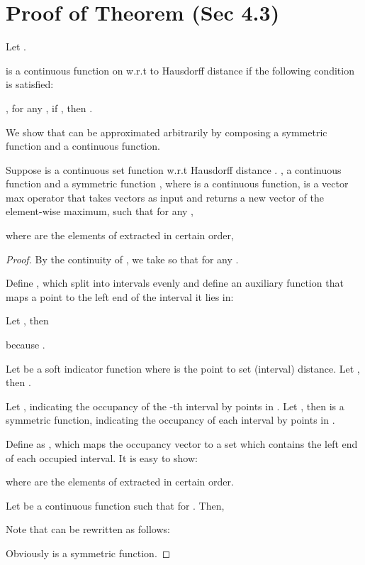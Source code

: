 \documentclass[10pt,twocolumn,letterpaper]{article}
\newenvironment{customthm}[1]
  {\renewcommand\theinnercustomthm{#1}\innercustomthm}
  {\endinnercustomthm}
\begin{document}
\section{Proof of Theorem (Sec 4.3)}
\label{sec:proof}
Let . 

 is a continuous function on  w.r.t to Hausdorff distance  if the following condition is satisfied:

, for any , if , then .

We show that  can be approximated arbitrarily by composing a symmetric function and a continuous function. 

\begin{customthm}{1}
Suppose  is a continuous set function w.r.t Hausdorff distance . ,  a continuous function  and a symmetric function , where  is a continuous function,  is a vector max operator that takes  vectors as input and returns a new vector of the element-wise maximum, such that for any ,

where  are the elements of  extracted in certain order, 
\end{customthm}


\begin{proof}
By the continuity of , we take  so that 
 for any . 

Define , which split  into  intervals evenly and define an auxiliary function that maps a point to the left end of the interval it lies in:

Let , then

because .

Let  be a soft indicator function where  is the point to set (interval) distance. Let , then . 

Let , indicating the occupancy of the -th interval by points in . Let , then  is a symmetric function, indicating the occupancy of each interval by points in . 

Define  as , which maps the occupancy vector to a set which contains the left end of each occupied interval. It is easy to show:

where  are the elements of  extracted in certain order.

Let  be a continuous function such that  for . Then,


Note that  can be rewritten as follows:

Obviously  is a symmetric function.
\end{proof}
\end{document}
